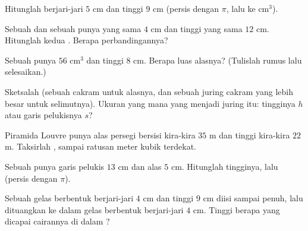 \begin{exercise}[$\star$]\label{exo:g8:solids:3}
Hitunglah   berjari-jari $5$ cm dan tinggi $9$ cm
(persis dengan $\pi$, lalu  ke cm$^3$).
\end{exercise}

\begin{exercise}[$\star$]\label{exo:g8:solids:4}
Sebuah  dan sebuah  punya  yang sama $4$ cm dan
tinggi yang sama $12$ cm. Hitunglah kedua . Berapa
perbandingannya?
\end{exercise}

\begin{exercise}[$\star$]\label{exo:g8:solids:5}
Sebuah  punya  $56$ cm$^3$ dan tinggi $8$ cm. Berapa luas
alasnya? (Tulislah rumus  lalu selesaikan.)
\end{exercise}

\begin{exercise}[$\star$]\label{exo:g8:solids:6}
Sketsalah   (sebuah cakram untuk alasnya, dan
sebuah juring cakram yang lebih besar untuk selimutnya). Ukuran
 yang mana yang menjadi  juring itu: tingginya $h$
atau garis pelukisnya $s$?
\end{exercise}

\begin{exercise}[$\star\star$]\label{exo:g8:solids:7}
Piramida Louvre punya alas persegi bersisi kira-kira $35$ m dan
tinggi kira-kira $22$ m. Taksirlah , sampai ratusan meter
kubik terdekat.
\end{exercise}

\begin{exercise}[$\star\star$]\label{exo:g8:solids:8}
Sebuah  punya garis pelukis $13$ cm dan  alas $5$ cm.
Hitunglah tingginya, lalu  (persis dengan $\pi$).
\end{exercise}

\begin{exercise}[$\star\star$]\label{exo:g8:solids:9}
Sebuah gelas berbentuk  berjari-jari $4$ cm dan tinggi $9$ cm
diisi sampai penuh, lalu dituangkan ke dalam gelas berbentuk 
berjari-jari $4$ cm. Tinggi berapa yang dicapai cairannya di dalam ?
\end{exercise}

